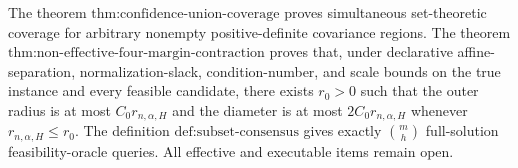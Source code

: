 The theorem \(\text{thm:confidence-union-coverage}\) proves simultaneous set-theoretic coverage for arbitrary nonempty positive-definite covariance regions. The theorem \(\text{thm:non-effective-four-margin-contraction}\) proves that, under declarative affine-separation, normalization-slack, condition-number, and scale bounds on the true instance and every feasible candidate, there exists \(r_0>0\) such that the outer radius is at most \(C_0r_{n,\alpha,H}\) and the diameter is at most \(2C_0r_{n,\alpha,H}\) whenever \(r_{n,\alpha,H}\leq r_0\). The definition \(\text{def:subset-consensus}\) gives exactly \(\binom{m}{h}\) full-solution feasibility-oracle queries. All effective and executable items remain open.
